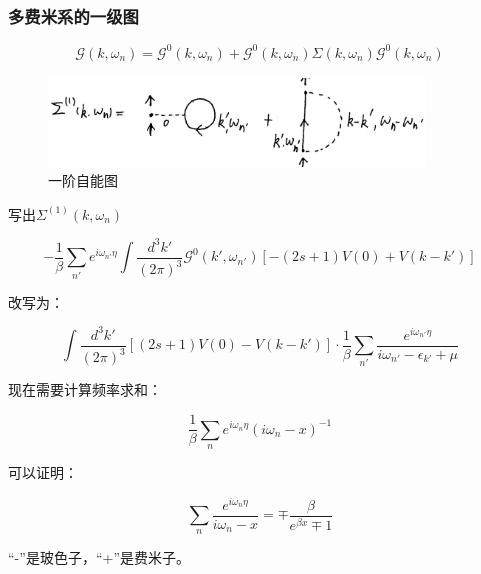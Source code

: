 \subsubsection{多费米系的一级图}

\begin{equation}
\mathcal{G}(k, \omega_n) = \mathcal{G}^0 (k, \omega_n) + \mathcal{G}^0 (k, \omega_n) \Sigma (k, \omega_n) \mathcal{G}^0  (k, \omega_n)   
\end{equation}

\begin{figure}[htbp]
\begin{center}
\includegraphics[width=10cm]{Finite/1stselfenergy.png}
\caption{一阶自能图}
\end{center}
\end{figure}


写出$\Sigma^{(1)}(k, \omega_n)$

\begin{equation}
 - \frac{1}{\beta} \sum\limits_{n'} e^{i \omega_{n'} \eta} \int  \frac{d^3 k'} {(2 \pi)^3} \mathcal{G}^0 (k', \omega_{n'}) \left[ -(2s+1) V(0) + V(k - k')  \right]
\end{equation}

改写为：

\begin{equation*}
\int \frac{d^3 k'}{(2 \pi)^3} \left[ (2s+1) V(0) - V(k-k') \right] \cdot \frac{1}{\beta} \sum\limits_{n'} \frac{e^{i \omega_{n'} \eta} }{ i \omega_{n'}  - \epsilon_{k'} + \mu }
\end{equation*}

现在需要计算频率求和：

\begin{equation}
\frac{1}{\beta} \sum\limits_n e^{i \omega_n \eta} (i \omega_n - x )^{-1}
\end{equation}

可以证明：

\begin{equation}
\sum\limits_n \frac{ e^{ i \omega_n \eta } }{ i \omega_n - x } = \mp \frac{\beta}{  e^{\beta x} \mp 1 }
\end{equation}

“-”是玻色子，“+”是费米子。

